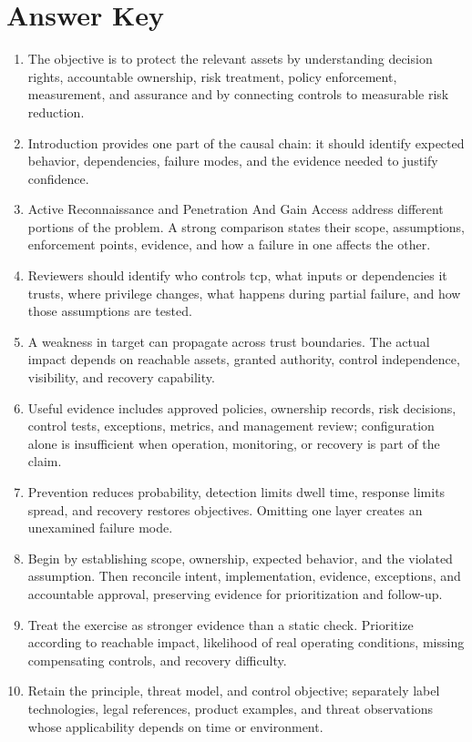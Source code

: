 \documentclass[11pt]{article}
\begin{document}
\section*{Answer Key}
\begin{enumerate}
\item The objective is to protect the relevant assets by understanding decision rights, accountable ownership, risk treatment, policy enforcement, measurement, and assurance and by connecting controls to measurable risk reduction.
\item Introduction provides one part of the causal chain: it should identify expected behavior, dependencies, failure modes, and the evidence needed to justify confidence.
\item Active Reconnaissance and Penetration And Gain Access address different portions of the problem. A strong comparison states their scope, assumptions, enforcement points, evidence, and how a failure in one affects the other.
\item Reviewers should identify who controls tcp, what inputs or dependencies it trusts, where privilege changes, what happens during partial failure, and how those assumptions are tested.
\item A weakness in target can propagate across trust boundaries. The actual impact depends on reachable assets, granted authority, control independence, visibility, and recovery capability.
\item Useful evidence includes approved policies, ownership records, risk decisions, control tests, exceptions, metrics, and management review; configuration alone is insufficient when operation, monitoring, or recovery is part of the claim.
\item Prevention reduces probability, detection limits dwell time, response limits spread, and recovery restores objectives. Omitting one layer creates an unexamined failure mode.
\item Begin by establishing scope, ownership, expected behavior, and the violated assumption. Then reconcile intent, implementation, evidence, exceptions, and accountable approval, preserving evidence for prioritization and follow-up.
\item Treat the exercise as stronger evidence than a static check. Prioritize according to reachable impact, likelihood of real operating conditions, missing compensating controls, and recovery difficulty.
\item Retain the principle, threat model, and control objective; separately label technologies, legal references, product examples, and threat observations whose applicability depends on time or environment.
\end{enumerate}
\end{document}
